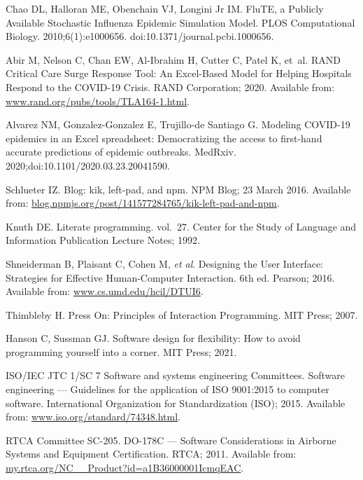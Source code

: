 \documentclass{article}
\begin{document}
\begin{thebibliography}{10}
Chao DL, Halloran ME, Obenchain VJ, {Longini Jr} IM.
\newblock FluTE, a Publicly Available Stochastic Influenza Epidemic Simulation
  Model.
\newblock PLOS Computational Biology. 2010;6(1):e1000656.
\newblock doi:{10.1371/journal.pcbi.1000656}.

Abir M, Nelson C, Chan EW, Al-Ibrahim H, Cutter C, Patel K, et~al.
\newblock RAND Critical Care Surge Response Tool: An Excel-Based Model for
  Helping Hospitals Respond to the COVID-19 Crisis.
\newblock RAND Corporation; 2020.
\newblock Available from: \url{www.rand.org/pubs/tools/TLA164-1.html}.

Alvarez NM, Gonzalez-Gonzalez E, Trujillo-de Santiago G.
\newblock Modeling {COVID-19} epidemics in an Excel spreadsheet:
  {Democratizing} the access to first-hand accurate predictions of epidemic
  outbreaks.
\newblock MedRxiv. 2020;doi:{10.1101/2020.03.23.20041590}.

Schlueter IZ.
\newblock Blog: kik, left-pad, and npm.
\newblock NPM Blog; 23 March 2016.
\newblock Available from:
  \url{blog.npmjs.org/post/141577284765/kik-left-pad-and-npm}.

Knuth DE.
\newblock Literate programming. vol.~27.
\newblock Center for the Study of Language and Information Publication Lecture
  Notes; 1992.

Shneiderman B, Plaisant C, Cohen M, {\emph{et al}}.
\newblock Designing the User Interface: Strategies for Effective Human-Computer
  Interaction.
\newblock 6th ed. Pearson; 2016.
\newblock Available from: \url{www.cs.umd.edu/hcil/DTUI6}.

Thimbleby H.
\newblock Press On: Principles of Interaction Programming.
\newblock MIT Press; 2007.

Hanson C, Sussman GJ.
\newblock Software design for flexibility: How to avoid programming yourself
  into a corner.
\newblock MIT Press; 2021.

{ISO/IEC JTC 1/SC 7 Software and systems engineering Committees}.
\newblock Software engineering --- Guidelines for the application of ISO
  9001:2015 to computer software.
\newblock International Organization for Standardization (ISO); 2015.
\newblock Available from: \url{www.iso.org/standard/74348.html}.

{RTCA Committee SC-205}.
\newblock DO-178C --- Software Considerations in Airborne Systems and Equipment
  Certification.
\newblock RTCA; 2011.
\newblock Available from: \url{my.rtca.org/NC__Product?id=a1B36000001IcmqEAC}.


\end{thebibliography}
\end{document}
